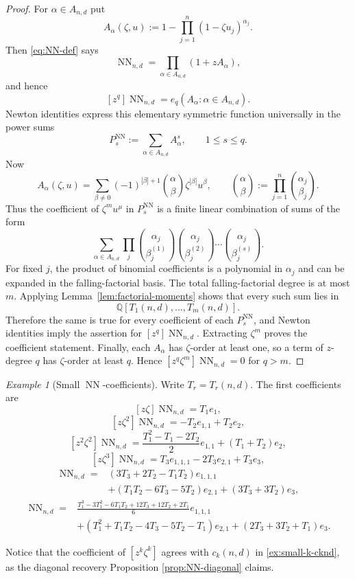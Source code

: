 \documentclass[11pt]{amsart}
\numberwithin{equation}{section}
\theoremstyle{remark}
\newtheorem{example}[theorem]{Example}
\newcommand{\Q}{\mathbb Q}
\newcommand{\NN}{\operatorname{NN}}
\begin{document}
\begin{proof}
For $\alpha\in A_{n,d}$ put
\[
  A_\alpha(\zeta,u):=1-\prod_{j=1}^n(1-\zeta u_j)^{\alpha_j}.
\]
Then \eqref{eq:NN-def} says
\[
  \NN_{n,d}=\prod_{\alpha\in A_{n,d}}(1+zA_\alpha),
\]
and hence
\[
  [z^q]\NN_{n,d}=e_q(A_\alpha:\alpha\in A_{n,d}).
\]
Newton identities express this elementary symmetric function universally in the power sums
\[
  P_s^{\NN}:=\sum_{\alpha\in A_{n,d}}A_\alpha^s,
  \qquad 1\le s\le q.
\]
Now
\[
  A_\alpha(\zeta,u)=
  \sum_{\beta\ne0}(-1)^{|\beta|+1}
  \binom{\alpha}{\beta}\zeta^{|\beta|}u^\beta,
  \qquad
  \binom{\alpha}{\beta}:=\prod_{j=1}^n\binom{\alpha_j}{\beta_j}.
\]
Thus the coefficient of $\zeta^m u^\mu$ in $P_s^{\NN}$ is a finite linear combination of sums of the form
\[
  \sum_{\alpha\in A_{n,d}}
  \prod_j
  \binom{\alpha_j}{\beta_j^{(1)}}
  \binom{\alpha_j}{\beta_j^{(2)}}\cdots
  \binom{\alpha_j}{\beta_j^{(s)}}.
\]
For fixed $j$, the product of binomial coefficients is a polynomial in $\alpha_j$ and can be expanded in the falling-factorial basis.  The total falling-factorial degree is at most $m$.  Applying Lemma~\ref{lem:factorial-moments} shows that every such sum lies in
\[
  \Q[T_1(n,d),\ldots,T_m(n,d)].
\]
Therefore the same is true for every coefficient of each $P_s^{\NN}$, and Newton identities imply the assertion for $[z^q]\NN_{n,d}$.  Extracting $\zeta^m$ proves the coefficient statement.  Finally, each $A_\alpha$ has $\zeta$-order at least one, so a term of $z$-degree $q$ has $\zeta$-order at least $q$.  Hence $[z^q\zeta^m]\NN_{n,d}=0$ for $q>m$.
\end{proof}



\begin{example}[Small $\NN$-coefficients]\label{ex:NN-small}
Write $T_r=T_r(n,d)$.  The first coefficients are
\[
  [z\zeta]\NN_{n,d}=T_1e_1,
\]
\[
  [z\zeta^2]\NN_{n,d}=-T_2e_{1,1}+T_2e_2,
\]
\[
  [z^2\zeta^2]\NN_{n,d}=
  \frac{T_1^2-T_1-2T_2}{2}e_{1,1}+(T_1+T_2)e_2,
\]
\[
  [z\zeta^3]\NN_{n,d}=T_3e_{1,1,1}-2T_3e_{2,1}+T_3e_3,
\]
\begin{align*}
  [z^2\zeta^3]\NN_{n,d}={}&
  (3T_3+2T_2-T_1T_2)e_{1,1,1}\\
  &+(T_1T_2-6T_3-5T_2)e_{2,1}
  +(3T_3+3T_2)e_3,
\end{align*}
\begin{align*}
  [z^3\zeta^3]\NN_{n,d}={}&
  \frac{T_1^3-3T_1^2-6T_1T_2+12T_3+12T_2+2T_1}{6}e_{1,1,1}\\
  &+(T_1^2+T_1T_2-4T_3-5T_2-T_1)e_{2,1}
  +(2T_3+3T_2+T_1)e_3.
\end{align*}

Notice that the coefficient of $[z^k\zeta^k]$ agrees with $c_k(n,d)$ in \ref{ex:small-k-cknd}, as the diagonal recovery Proposition \ref{prop:NN-diagonal} claims.
\end{example}
\end{document}
